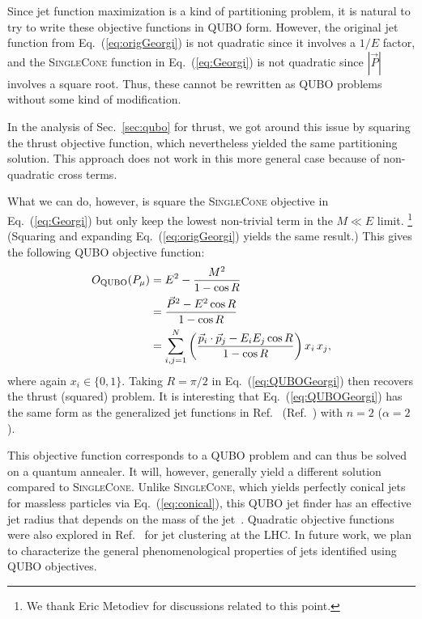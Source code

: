 \documentclass[aps,prd,twocolumn,superscriptaddress,preprintnumbers,nofootinbib,longbibliography,floatfix]{revtex4-1}
\DeclareRobustCommand{\Sec}[1]{Sec.~\ref{#1}}
\DeclareRobustCommand{\Eq}[1]{Eq.~(\ref{#1})}
\DeclareRobustCommand{\Ref}[1]{Ref.~\cite{#1}}
\begin{document}
Since jet function maximization is a kind of partitioning problem, it is natural to try to write these objective functions in QUBO form.
%
However, the original jet function from \Eq{eq:origGeorgi} is not quadratic since it involves a $1/E$ factor, and the \textsc{SingleCone} function in \Eq{eq:Georgi} is not quadratic since $|\vec{P}|$ involves a square root.
%
Thus, these cannot be rewritten as QUBO problems without some kind of modification.


In the analysis of \Sec{sec:qubo} for thrust, we got around this issue by squaring the thrust objective function, which nevertheless yielded the same partitioning solution.
%
This approach does not work in this more general case because of non-quadratic cross terms.


What we can do, however, is square the \textsc{SingleCone} objective in \Eq{eq:Georgi} but only keep the lowest non-trivial term in the $M \ll E$ limit.%
%
\footnote{We thank Eric Metodiev for discussions related to this point.}
%
(Squaring and expanding \Eq{eq:origGeorgi} yields the same result.)
%
This gives the following QUBO objective function:
%
\begin{align}
\label{eq:QUBOGeorgi}
O_{\rm QUBO}(P_{\mu}) & = E^2-\frac{M^2}{1 - \cos R} \nonumber \\
&= \frac{\vec{P}^2 -E^2\cos R}{1 - \cos R} \nonumber \\
&= \sum_{i,j = 1}^N \left(\frac{\vec{p}_i\cdot\vec{p}_j -E_iE_j\cos R}{1 - \cos R} \right) x_i \, x_j,
\end{align}
%
where again $x_i\in\{0,1\}$.
%
Taking $R=\pi/2$ in \Eq{eq:QUBOGeorgi} then recovers the thrust (squared) problem.
%
It is interesting that \Eq{eq:QUBOGeorgi} has the same form as the generalized jet functions in \Ref{Ge:2014ova} (\Ref{Bai:2014qca}) with $n = 2$ ($\alpha = 2$).



This objective function corresponds to a \ac{QUBO} problem and can thus be solved on a quantum annealer.
%
It will, however, generally yield a different solution compared to \textsc{SingleCone}.
%
Unlike \textsc{SingleCone}, which yields perfectly conical jets for massless particles via \Eq{eq:conical}, this QUBO jet finder has an effective jet radius that depends on the mass of the jet~\cite{Ge:2014ova,Bai:2014qca}.
%
Quadratic objective functions were also explored in \Ref{Bai:2015fka} for jet clustering at the \ac{LHC}.
%
In future work, we plan to characterize the general phenomenological properties of jets identified using QUBO objectives.
\end{document}
